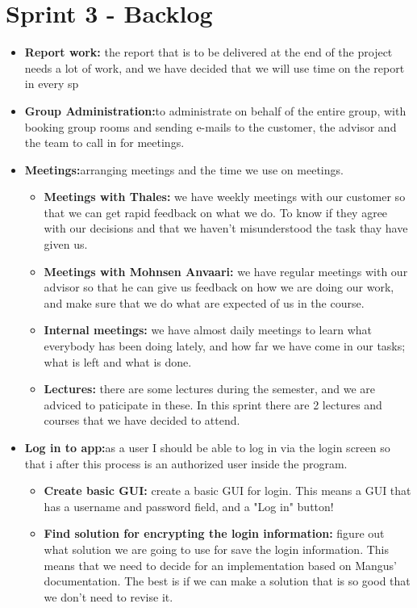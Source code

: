 \section{Sprint 3 - Backlog}

\begin{itemize}
\item{}\textbf{Report work:} the report that is to be delivered at the end of the project needs a lot of work, and we have decided that we will use time on the report in every sp
\item{}\textbf{Group Administration:}to administrate on behalf of the entire group, with booking group rooms and sending e-mails to the customer, the advisor and the team to call in for meetings.
\item{}\textbf{Meetings:}arranging meetings and the time we use on meetings.
\begin{itemize}
\item{}\textbf{Meetings with Thales:} we have weekly meetings with our customer so that we can get rapid feedback on what we do. To know if they agree with our decisions and that we haven't misunderstood the task thay have given us.
\item{}\textbf{Meetings with Mohnsen Anvaari:} we have regular meetings with our advisor so that he can give us feedback on how we are doing our work, and make sure that we do what are expected of us in the course.
\item{}\textbf{Internal meetings:} we have almost daily meetings to learn what everybody has been doing lately, and how far we have come in our tasks; what is left and what is done.
\item{}\textbf{Lectures:} there are some lectures during the semester, and we are adviced to paticipate in these. In this sprint there are 2 lectures and courses that we have decided to attend.
\end{itemize}
\item{}\textbf{Log in to app:}as a user I should be able to log in via the login screen so that i after this process is an authorized user inside the program.
\begin{itemize}
\item{}\textbf{Create basic GUI:} create a basic GUI for login. This means a GUI that has a username and password field, and a "Log in" button!
\item{}\textbf{Find solution for encrypting the login information:} figure out what solution we are going to use for save the login information. This means that we need to decide for an implementation based on Mangus' documentation. The best is if we can make a solution that is so good that we don’t need to revise it.

\end{itemize}
\end{itemize}

